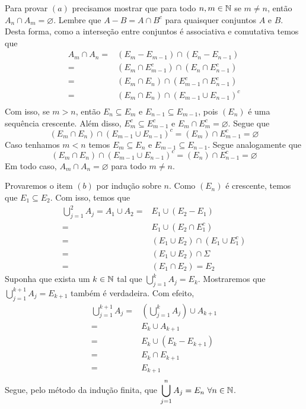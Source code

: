 \begin{prova}
    Para provar $(a)$ precisamos mostrar que para todo $n,m \in \operatorname{\mathbb{N}}$ se $m \neq n$, então $A_n \cap A_m = \varnothing$.
    Lembre que $A - B = A\cap B^c$ para quaisquer conjuntos $A$ e $B$.
    Desta forma, como a interseção entre conjuntos é associativa e comutativa temos que
    \begin{align*}
        A_m\cap A_n =& (E_m - E_{m -1}) \cap (E_n - E_{n -1})\\
        =& (E_m \cap E_{m -1}^c) \cap (E_n \cap E_{n -1}^c)\\
        =& (E_m \cap E_n) \cap ( E_{m -1}^c\cap E_{n -1}^c)\\
        =& (E_m \cap E_n) \cap \left( E_{m -1}\cup E_{n -1}\right)^c\\
    \end{align*}
    Com isso, se $m > n$, então $E_n \subseteq E_m$ e $E_{n-1} \subseteq E_{m-1}$, pois $(E_n)$ é uma sequência crescente.
    Além disso, $E_m^c \subseteq E_{m -1}^c$ e $E_m \cap E_m^c = \varnothing$.
    Segue que
    $$
    (E_m \cap E_n) \cap \left( E_{m -1}\cup E_{n -1}\right)^c =
    (E_m) \cap E_{m -1}^c = 
    \varnothing
    $$
    Caso tenhamos $m < n$ temos $E_m \subseteq E_n$ e $E_{m-1} \subseteq E_{n-1}$.
    Segue analogamente que 
    $$
    (E_m \cap E_n) \cap \left( E_{m -1}\cup E_{n -1}\right)^c =
    (E_n) \cap E_{n -1}^c = 
    \varnothing
    $$
    Em todo caso, $A_m \cap A_n = \varnothing$ para todo $m \neq n$.

    Provaremos o item $(b)$ por indução sobre $n$.
    Como $(E_n)$ é crescente, temos que $E_1 \subseteq E_2$.
    Com isso, temos que 
        \begin{align*}
            \bigcup_{j = 1}^2 A_j = A_1 \cup A_2= & E_1 \cup (E_2 - E_1)\\
            = & E_1 \cup (E_2 \cap E_1^c)\\
            = & (E_1 \cup E_2) \cap (E_1 \cup E_1^c)\\
            = & (E_1 \cup E_2) \cap \Sigma\\
            = & (E_1 \cap E_2)
            = E_2  
        \end{align*}
    Suponha que exista um $k \in \operatorname{\mathbb{N}}$ tal que $\displaystyle \bigcup_{j = 1}^k A_j = E_k$.
    Mostraremos que $\displaystyle \bigcup_{j = 1}^{k+1} A_j = E_{k +1}$ também é verdadeira.
    Com efeito, 
    \begin{align*}
        \bigcup_{j = 1}^{k+1} A_j =& \left(\bigcup_{j = 1}^{k} A_j\right) \cup A_{k+1}\\
        =& E_k \cup A_{k +1}\\
        =& E_k \cup (E_k - E_{k+1})\\
        =& E_k \cap E_{k+1}\\
        =& E_{k+1}\\
    \end{align*}
    Segue, pelo método da indução finita, que $\displaystyle \bigcup_{j = 1}^n A_j = E_n\ \forall n \in \operatorname{\mathbb{N}}$.


\end{prova}
